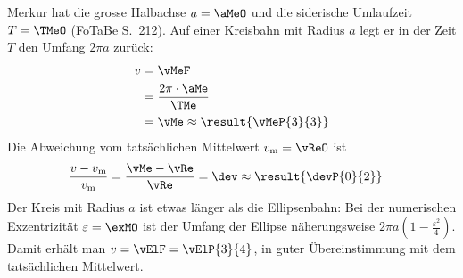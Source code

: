 Merkur hat die grosse Halbachse $a = \aMeO$ und die siderische Umlaufzeit $T = \TMeO$ (FoTaBe S.~212). Auf einer Kreisbahn mit Radius $a$ legt er in der Zeit $T$ den Umfang $2\pi a$ zurück:
\begin{align}
 v &= \vMeF \\
   &= \frac{2\pi\cdot\aMe}{\TMe} \\
   &= \vMe \approx \result{\vMeP{3}{3}}
\end{align}
Die Abweichung vom tatsächlichen Mittelwert $v_\text{m} = \vReO$ ist
\begin{align}
 \frac{v-v_\text{m}}{v_\text{m}} &= \frac{\vMe-\vRe}{\vRe} = \dev \approx \result{\devP{0}{2}}
\end{align}
Der Kreis mit Radius $a$ ist etwas länger als die Ellipsenbahn: Bei der numerischen Exzentrizität $\varepsilon = \exMO$ ist der Umfang der Ellipse näherungsweise $2\pi a\left(1-\frac{\varepsilon^2}{4}\right)$. Damit erhält man $v = \vElF = \vElP{3}{4}$, in guter Übereinstimmung mit dem tatsächlichen Mittelwert.
